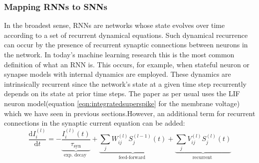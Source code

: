 \documentclass[12pt]{report}
\begin{document}
\subsubsection{Mapping RNNs to SNNs}
In the broadest sense, RNNs are networks whose state evolves over time according to a set of recurrent dynamical equations. Such dynamical recurrence can occur by the presence of recurrent synaptic connections between neurons in the network. In today's machine learning research this is the most common definition of what an RNN is. This occurs, for example, when stateful neuron or synapse models with internal dynamics are employed. These dynamics are intrinsically recurrent since the network's state at a given time step recurrently depends on its state at prior time steps. The paper as per usual uses the LIF neuron model(equation \ref{eqn:integratedsuperspike} for the membrane voltage) which we have seen in previous sections.However, an additional term for recurrent connections in the synaptic current equation can be added:
\begin{equation}
\label{eqn:surrogate_current_dynamics}
\frac{\mathrm{d} I_{i}^{(l)}}{\mathrm{d} t}=-\underbrace{\frac{I_{i}^{(l)}(t)}{\tau_{\mathrm{syn}}}}_{\text {exp. decay }}+\underbrace{\sum_{j} W_{i j}^{(l)} S_{j}^{(l-1)}(t)}_{\text {feed-forward }}+\underbrace{\sum_{j} V_{i j}^{(l)} S_{j}^{(l)}(t)}_{\text {recurrent }}
\end{equation}
\end{document}
